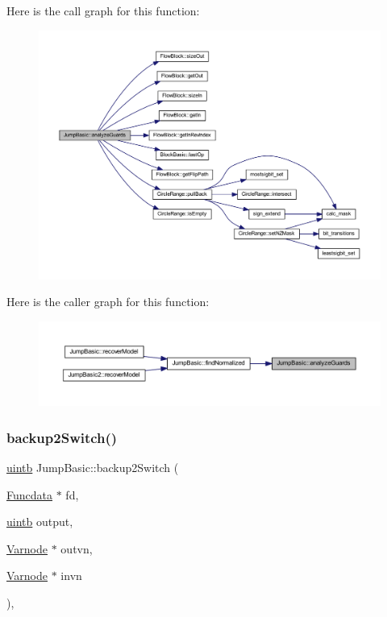 Here is the call graph for this function\+:
\nopagebreak
\begin{figure}[H]
\begin{center}
\leavevmode
\includegraphics[width=350pt]{class_jump_basic_ae00e064a5ca6c4dcd06e245fbc997e5b_cgraph}
\end{center}
\end{figure}
Here is the caller graph for this function\+:
\nopagebreak
\begin{figure}[H]
\begin{center}
\leavevmode
\includegraphics[width=350pt]{class_jump_basic_ae00e064a5ca6c4dcd06e245fbc997e5b_icgraph}
\end{center}
\end{figure}
\mbox{\label{class_jump_basic_a0b60980f79f56d8425f2cd5c231ddc25}} 
\subsubsection{\texorpdfstring{backup2Switch()}{backup2Switch()}}
{\footnotesize\ttfamily \mbox{\hyperlink{types_8h_a2db313c5d32a12b01d26ac9b3bca178f}{uintb}} Jump\+Basic\+::backup2\+Switch (\begin{DoxyParamCaption}\item[{\mbox{\hyperlink{class_funcdata}{Funcdata}} $\ast$}]{fd,  }\item[{\mbox{\hyperlink{types_8h_a2db313c5d32a12b01d26ac9b3bca178f}{uintb}}}]{output,  }\item[{\mbox{\hyperlink{class_varnode}{Varnode}} $\ast$}]{outvn,  }\item[{\mbox{\hyperlink{class_varnode}{Varnode}} $\ast$}]{invn }\end{DoxyParamCaption})\hspace{0.3cm}{\ttfamily [static]}, {\ttfamily [protected]}}



